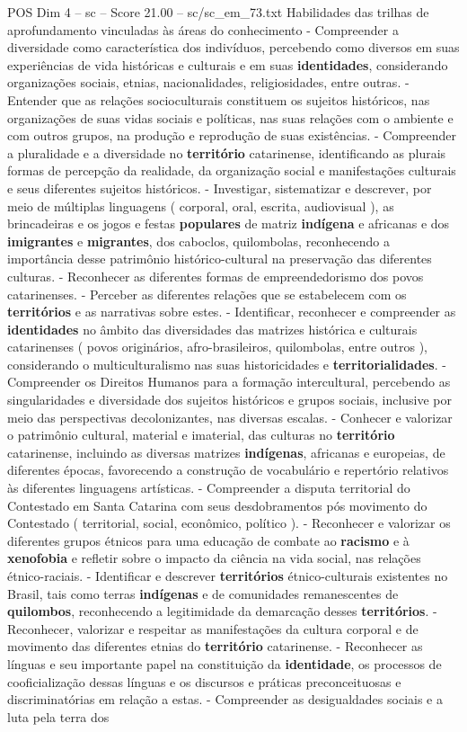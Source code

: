 \begin{textsample}{POS Dim 4 – sc – Score 21.00 – sc/sc\_em\_73.txt}
Habilidades das trilhas de aprofundamento vinculadas às áreas do conhecimento - Compreender a diversidade como característica dos indivíduos, percebendo como diversos em suas experiências de vida históricas e culturais e em suas \textbf{identidades}, considerando organizações sociais, etnias, nacionalidades, religiosidades, entre outras. - Entender que as relações socioculturais constituem os sujeitos históricos, nas organizações de suas vidas sociais e políticas, nas suas relações com o ambiente e com outros grupos, na produção e reprodução de suas existências. - Compreender a pluralidade e a diversidade no \textbf{território} catarinense, identificando as plurais formas de percepção da realidade, da organização social e manifestações culturais e seus diferentes sujeitos históricos. - Investigar, sistematizar e descrever, por meio de múltiplas linguagens ( corporal, oral, escrita, audiovisual ), as brincadeiras e os jogos e festas \textbf{populares} de matriz \textbf{indígena} e africanas e dos \textbf{imigrantes} e \textbf{migrantes}, dos caboclos, quilombolas, reconhecendo a importância desse patrimônio histórico-cultural na preservação das diferentes culturas. - Reconhecer as diferentes formas de empreendedorismo dos povos catarinenses. - Perceber as diferentes relações que se estabelecem com os \textbf{territórios} e as narrativas sobre estes. - Identificar, reconhecer e compreender as \textbf{identidades} no âmbito das diversidades das matrizes histórica e culturais catarinenses ( povos originários, afro-brasileiros, quilombolas, entre outros ), considerando o multiculturalismo nas suas historicidades e \textbf{territorialidades}. - Compreender os Direitos Humanos para a formação intercultural, percebendo as singularidades e diversidade dos sujeitos históricos e grupos sociais, inclusive por meio das perspectivas decolonizantes, nas diversas escalas. - Conhecer e valorizar o patrimônio cultural, material e imaterial, das culturas no \textbf{território} catarinense, incluindo as diversas matrizes \textbf{indígenas}, africanas e europeias, de diferentes épocas, favorecendo a construção de vocabulário e repertório relativos às diferentes linguagens artísticas. - Compreender a disputa territorial do Contestado em Santa Catarina com seus desdobramentos pós movimento do Contestado ( territorial, social, econômico, político ). - Reconhecer e valorizar os diferentes grupos étnicos para uma educação de combate ao \textbf{racismo} e à \textbf{xenofobia} e refletir sobre o impacto da ciência na vida social, nas relações étnico-raciais. - Identificar e descrever \textbf{territórios} étnico-culturais existentes no Brasil, tais como terras \textbf{indígenas} e de comunidades remanescentes de \textbf{quilombos}, reconhecendo a legitimidade da demarcação desses \textbf{territórios}. - Reconhecer, valorizar e respeitar as manifestações da cultura corporal e de movimento das diferentes etnias do \textbf{território} catarinense. - Reconhecer as línguas e seu importante papel na constituição da \textbf{identidade}, os processos de cooficialização dessas línguas e os discursos e práticas preconceituosas e discriminatórias em relação a estas. - Compreender as desigualdades sociais e a luta pela terra dos 
\end{textsample}
